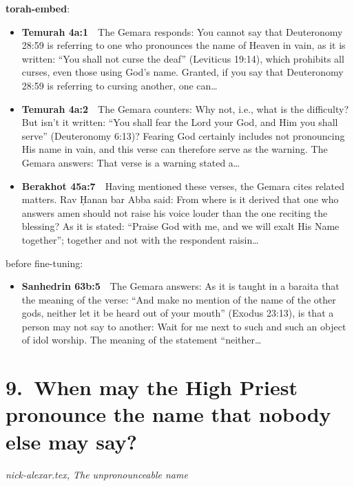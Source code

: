 \documentclass[11pt,a4paper]{article}
\begin{document}
{\color{quiet}\small\textbf{torah-embed}:}
\begin{itemize}[leftmargin=1.2em,itemsep=3pt]
\item {\color{ref}\textbf{Temurah 4a:1}}\ \ The Gemara responds: You cannot say that Deuteronomy 28:59 is referring to one who pronounces the name of Heaven in vain, as it is written: “You shall not curse the deaf” (Leviticus 19:14), which prohibits all curses, even those using God’s name. Granted, if you say that Deuteronomy 28:59 is referring to cursing another, one can\ldots
\item {\color{ref}\textbf{Temurah 4a:2}}\ \ The Gemara counters: Why not, i.e., what is the difficulty? But isn’t it written: “You shall fear the Lord your God, and Him you shall serve” (Deuteronomy 6:13)? Fearing God certainly includes not pronouncing His name in vain, and this verse can therefore serve as the warning. The Gemara answers: That verse is a warning stated a\ldots
\item {\color{ref}\textbf{Berakhot 45a:7}}\ \ Having mentioned these verses, the Gemara cites related matters. Rav Ḥanan bar Abba said: From where is it derived that one who answers amen should not raise his voice louder than the one reciting the blessing? As it is stated: “Praise God with me, and we will exalt His Name together”; together and not with the respondent raisin\ldots
\end{itemize}
{\color{quiet}\small before fine-tuning:}
\begin{itemize}[leftmargin=1.2em]
\item {\color{ref}\textbf{Sanhedrin 63b:5}}\ \ The Gemara answers: As it is taught in a baraita that the meaning of the verse: “And make no mention of the name of the other gods, neither let it be heard out of your mouth” (Exodus 23:13), is that a person may not say to another: Wait for me next to such and such an object of idol worship. The meaning of the statement “neither\ldots
\end{itemize}

\section*{9.\ When may the High Priest pronounce the name that nobody else may say?}
{\color{quiet}\small\textit{nick-alexar.tex, The unpronounceable name}}
\end{document}
